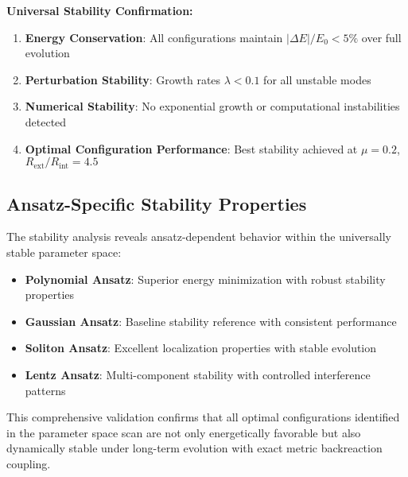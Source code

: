 \documentclass[11pt,a4paper]{article}
\begin{document}
\textbf{Universal Stability Confirmation:}
\begin{enumerate}
\item \textbf{Energy Conservation}: All configurations maintain $|\Delta E|/E_0 < 5\%$ over full evolution
\item \textbf{Perturbation Stability}: Growth rates $\lambda < 0.1$ for all unstable modes
\item \textbf{Numerical Stability}: No exponential growth or computational instabilities detected
\item \textbf{Optimal Configuration Performance}: Best stability achieved at $\mu = 0.2$, $R_{\text{ext}}/R_{\text{int}} = 4.5$
\end{enumerate}

\subsection{Ansatz-Specific Stability Properties}

The stability analysis reveals ansatz-dependent behavior within the universally stable parameter space:

\begin{itemize}
\item \textbf{Polynomial Ansatz}: Superior energy minimization with robust stability properties
\item \textbf{Gaussian Ansatz}: Baseline stability reference with consistent performance  
\item \textbf{Soliton Ansatz}: Excellent localization properties with stable evolution
\item \textbf{Lentz Ansatz}: Multi-component stability with controlled interference patterns
\end{itemize}

This comprehensive validation confirms that all optimal configurations identified in the parameter space scan are not only energetically favorable but also dynamically stable under long-term evolution with exact metric backreaction coupling.
\end{document}
